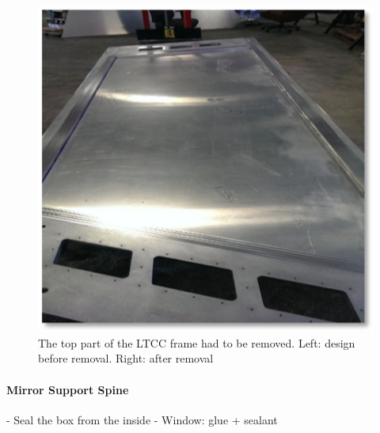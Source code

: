 \begin{figure}[hbt]
	\centering
	\includegraphics[width=1.0\columnwidth,keepaspectratio]{img/backWall.png}
	\caption{The top part of the LTCC frame had to be removed. Left: design before removal. Right: after removal}
	\label{fig:backWall}
\end{figure}


\paragraph{Mirror Support Spine}



- Seal the box from the inside
- Window: glue + sealant




